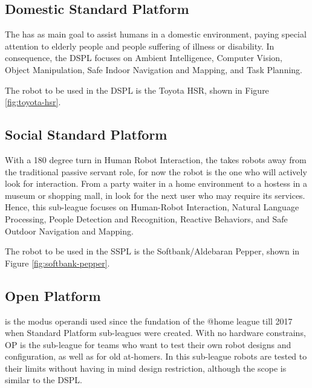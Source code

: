 \subsection{Domestic Standard Platform}
The  has as main goal to assist humans in a domestic environment, paying special attention to elderly people and people suffering of illness or disability. In consequence, the DSPL focuses on Ambient Intelligence, Computer Vision, Object Manipulation, Safe Indoor Navigation and Mapping, and Task Planning.

The robot to be used in the DSPL is the Toyota HSR, shown in Figure \ref{fig:toyota-hsr}.

\subsection{Social Standard Platform}
With a 180 degree turn in Human Robot Interaction, the  takes robots away from the traditional passive servant role, for now the robot is the one who will actively look for interaction. From a party waiter in a home environment to a hostess in a museum or shopping mall, in  look for the next user who may require its services. Hence, this sub-league focuses on Human-Robot Interaction, Natural Language Processing, People Detection and Recognition, Reactive Behaviors, and Safe Outdoor Navigation and Mapping.

The robot to be used in the SSPL is the Softbank/Aldebaran Pepper, shown in Figure \ref{fig:softbank-pepper}.

\subsection{Open Platform}
 is the modus operandi used since the fundation of the @home league till 2017 when Standard Platform sub-leagues were created. With no hardware constrains, OP is the sub-league for teams who want to test their own robot designs and configuration, as well as for old at-homers. In this sub-league robots are tested to their limits without having in mind design restriction, although the scope is similar to the DSPL. 